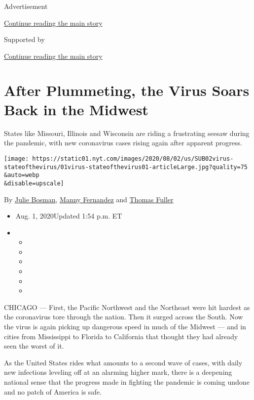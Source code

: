 Advertisement

\protect\hyperlink{after-top}{Continue reading the main story}

Supported by

\protect\hyperlink{after-sponsor}{Continue reading the main story}

\hypertarget{after-plummeting-the-virus-soars-back-in-the-midwest}{%
\section{After Plummeting, the Virus Soars Back in the
Midwest}\label{after-plummeting-the-virus-soars-back-in-the-midwest}}

States like Missouri, Illinois and Wisconsin are riding a frustrating
seesaw during the pandemic, with new coronavirus cases rising again
after apparent progress.

\texttt{[image: https://static01.nyt.com/images/2020/08/02/us/SUB02virus-stateofthevirus/01virus-stateofthevirus01-articleLarge.jpg?quality=75\\\&auto=webp\\\&disable=upscale]}

By \href{https://www.nytimes.com/by/julie-bosman}{Julie Bosman},
\href{https://www.nytimes.com/by/manny-fernandez}{Manny Fernandez} and
\href{https://www.nytimes.com/by/thomas-fuller}{Thomas Fuller}

\begin{itemize}
\item
  Aug. 1, 2020Updated 1:54 p.m. ET
\item
  \begin{itemize}
  \item
  \item
  \item
  \item
  \item
  \item
  \end{itemize}
\end{itemize}

CHICAGO --- First, the Pacific Northwest and the Northeast were hit
hardest as the coronavirus tore through the nation. Then it surged
across the South. Now the virus is again picking up dangerous speed in
much of the Midwest --- and in cities from Mississippi to Florida to
California that thought they had already seen the worst of it.

As the United States rides what amounts to a second wave of cases, with
daily new infections leveling off at an alarming higher mark, there is a
deepening national sense that the progress made in fighting the pandemic
is coming undone and no patch of America is safe.

